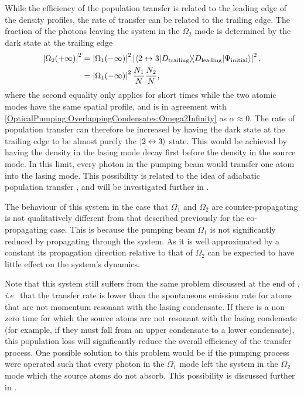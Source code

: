 While the efficiency of the population transfer is related to the leading edge of the density profiles, the rate of transfer can be related to the trailing edge.  The fraction of the photons leaving the system in the $\Omega_2$ mode is determined by the dark state at the trailing edge
\begin{align}
    \left|\Omega_2(+\infty)\right|^2 &= \left|\Omega_1(-\infty)\right|^2 \left|\left<2 \leftrightarrow 3\middle|D_\text{trailing}\right>\!\! \left<D_\text{leading}\middle|\Psi_\text{initial}\right>\right|^2, \\
    &= \left|\Omega_1(-\infty)\right|^2 \frac{N_1}{N} \frac{N_2}{N},
\end{align}
where the second equality only applies for short times while the two atomic modes have the same spatial profile, and is in agreement with \eqref{OpticalPumping:OverlappingCondensates:Omega2Infinity} as $\alpha \approx 0$.  The rate of population transfer can therefore be increased by having the dark state at the trailing edge to be almost purely the ${\left|2 \leftrightarrow 3\right>}$ state.  This would be achieved by having the density in the lasing mode decay first before the density in the source mode.  In this limit, every photon in the pumping beam would transfer one atom into the lasing mode.  This possibility is related to the idea of adiabatic population transfer \citep{Kuklinski:1989}, and will be investigated further in .

The behaviour of this system in the case that $\Omega_1$ and $\Omega_2$ are counter-propagating is not qualitatively different from that described previously for the co-propagating case.  This is because the pumping beam $\Omega_1$ is not significantly reduced by propagating through the system.  As it is well approximated by a constant its propagation direction relative to that of $\Omega_2$ can be expected to have little effect on the system's dynamics.

Note that this system still suffers from the same problem discussed at the end of , \emph{i.e.}\ that the transfer rate is lower than the spontaneous emission rate for atoms that are not momentum resonant with the lasing condensate.  If there is a non-zero time for which the source atoms are not resonant with the lasing condensate (for example, if they must fall from an upper condensate to a lower condensate), this population loss will significantly reduce the overall efficiency of the transfer process.  One possible solution to this problem would be if the pumping process were operated such that every photon in the $\Omega_1$ mode left the system in the $\Omega_2$ mode which the source atoms do not absorb.  This possibility is discussed further in .

